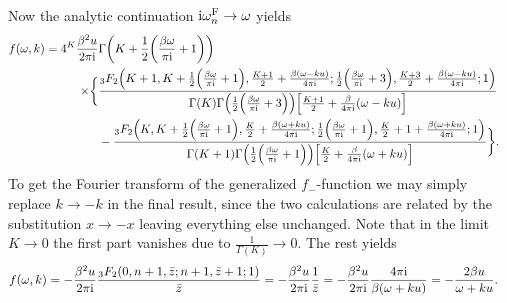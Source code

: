 \documentclass[english, parskip=full]{scrartcl}
\begin{document}
Now the analytic continuation $\text{i}\omega_n^{\text{F}} \rightarrow \omega$ yields
\begin{align}
f(\omega, k) &= \bsplit{4^K \frac{\beta^2u}{2\pi\i} & \Gamma\kla*{K + \frac{1}{2}\kla*{\frac{\beta \omega}{\pi\i} + 1}}\\ 
\times \klc[\bigg]{&\frac{{}_3F_2\kla*{K+1, K + \frac{1}{2}\kla*{\frac{\beta \omega}{\pi\i} + 1}, \frac{K+1}{2} + \frac{\beta \kla*{\omega - ku}}{4\pi\i}; \frac{1}{2}\kla*{\frac{\beta \omega}{\pi\i} + 3}, \frac{K+3}{2} + \frac{\beta \kla*{\omega - ku}}{4\pi\i}; 1}}{\Gamma(K) \Gamma\kla*{\frac{1}{2}\kla*{\frac{\beta \omega}{\pi\i} + 3}} \klb*{\frac{K+1}{2} + \frac{\beta}{4\pi\i} \kla*{\omega - ku}}}\\
&- \frac{{}_3F_2\kla*{K, K + \frac{1}{2}\kla*{\frac{\beta \omega}{\pi\i} + 1}, \frac{K}{2} + \frac{\beta \kla*{\omega + ku}}{4\pi\i}; \frac{1}{2}\kla*{\frac{\beta \omega}{\pi\i} + 1}, \frac{K}{2} + 1 + \frac{\beta \kla*{\omega + ku}}{4\pi\i}; 1}}{\Gamma(K+1) \Gamma\kla*{\frac{1}{2}\kla*{\frac{\beta \omega}{\pi\i} + 1}} \klb*{\frac{K}{2} + \frac{\beta}{4\pi\i} \kla*{\omega + ku}}}}.}
\end{align}
To get the Fourier transform of the generalized $f_-$-function we may simply replace $k\rightarrow -k$ in the final result, since the two calculations are related by the substitution $x\rightarrow -x$ leaving everything else unchanged.
Note that in the limit $K\rightarrow 0$ the first part vanishes due to $\frac{1}{\Gamma(K)} \rightarrow 0$.
The rest yields
\begin{align}
f(\omega, k) &= -\frac{\beta^2u}{2\pi\i} \frac{{}_3F_2\kla*{0, n+1, \bar{z}; n+1, \bar{z}+1; 1}}{\bar{z}} = -\frac{\beta^2u}{2\pi\i} \frac{1}{\bar{z}} = -\frac{\beta^2 u}{2\pi\i} \frac{4\pi\i}{\beta \kla*{\omega + ku}} = -\frac{2\beta u}{\omega + ku}.
\end{align}
\end{document}
